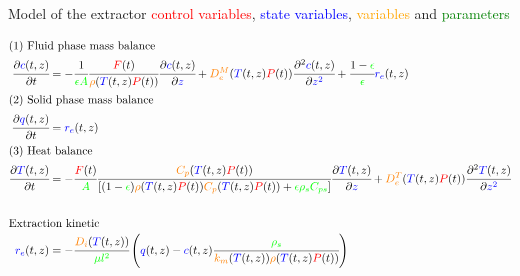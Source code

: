 \documentclass[8pt]{beamer}
\begin{document}
	\begin{frame}{Model of the extractor}
		\textcolor{red}{control variables},
		\textcolor{blue}{state variables},
		\textcolor{orange}{variables} and
		\textcolor{green}{parameters}\par
		{\footnotesize\begin{align*}
			\intertext{(1) Fluid phase mass balance}
			\cfrac{\partial \textcolor{blue}{c}(t,z)}{\partial t} &=  -\cfrac{1}{ \textcolor{green}{\epsilon A}}\cfrac{\textcolor{red}{F}(t)}{\textcolor{orange}{\rho}(\textcolor{blue}{T}(t,z)\textcolor{red}{P}(t))} \cfrac{\partial \textcolor{blue}{c}(t,z)}{\partial  \textcolor{blue}{z}} 
			+ \textcolor{orange}{D^M_e}(\textcolor{blue}{T}(t,z)\textcolor{red}{P}(t)) \cfrac{\partial^2 \textcolor{blue}{c}(t,z)}{\partial \textcolor{blue}{z^2}} + \cfrac{1-\textcolor{green}{\epsilon}}{\textcolor{green}{\epsilon}} \textcolor{blue}{r_e}(t,z)\\
		\intertext{(2) Solid phase mass balance}
			\cfrac{\partial \textcolor{blue}{q}(t,z)}{\partial t} &= \textcolor{blue}{r_e}(t,z)\\
		\intertext{(3) Heat balance}
			\cfrac{\partial \textcolor{blue}{T}(t,z)}{\partial t} &= -\cfrac{\textcolor{red}{F}(t)}{\textcolor{green}{A}} \cfrac{\textcolor{orange}{C_p}(\textcolor{blue}{T}(t,z)\textcolor{red}{P}(t))}{ [(1-\textcolor{green}{\epsilon})\textcolor{orange}{\rho}(\textcolor{blue}{T}(t,z)\textcolor{red}{P}(t)) \textcolor{orange}{C_p} (\textcolor{blue}{T}(t,z)\textcolor{red}{P}(t)) + \textcolor{green}{ \epsilon \rho_s C_{ps} } ]} \cfrac{\partial \textcolor{blue}{T}(t,z)}{\partial \textcolor{blue}{z}} 
			+  \textcolor{orange}{D^T_e}(\textcolor{blue}{T}(t,z)\textcolor{red}{P}(t)) \cfrac{\partial^2 \textcolor{blue}{T}(t,z)}{\partial \textcolor{blue}{z^2}}\\
		\\ \intertext{Extraction kinetic}
			\textcolor{blue}{r_e}(t,z) &= -\cfrac{\textcolor{orange}{D_i}(\textcolor{blue}{T}(t,z))}{\textcolor{green}{ \mu l^2} }\left(\textcolor{blue}{q}(t,z) - \textcolor{blue}{c}(t,z) \cfrac{\textcolor{green}{\rho_s}}{\textcolor{orange}{k_m}(\textcolor{blue}{T}(t,z))\textcolor{orange}{\rho}(\textcolor{blue}{T}(t,z)\textcolor{red}{P}(t))} \right)\\

\end{align*}}
\end{frame}
\end{document}
